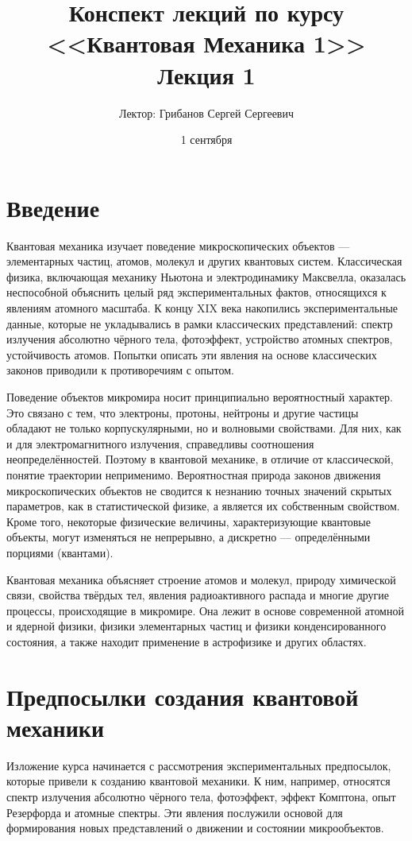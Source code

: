 \documentclass[a4paper, 12pt]{article}
\title{Конспект лекций по курсу <<Квантовая Механика 1>>  \\ \large Лекция 1}
\author{Лектор: Грибанов Сергей Сергеевич}
\date{1 сентября}
\begin{document}
\maketitle

\tableofcontents
\section{Введение}

Квантовая механика изучает поведение микроскопических объектов --- элементарных
частиц, атомов, молекул и других квантовых систем. Классическая физика,
включающая механику Ньютона и электродинамику Максвелла, оказалась неспособной
объяснить целый ряд экспериментальных фактов, относящихся к явлениям атомного
масштаба. К концу XIX века накопились экспериментальные данные, которые не укладывались в рамки
классических представлений: спектр излучения абсолютно чёрного тела,
фотоэффект, устройство атомных спектров, устойчивость атомов. Попытки
описать эти явления на основе классических законов приводили к противоречиям
с опытом.

Поведение объектов микромира носит принципиально вероятностный характер. Это
связано с тем, что электроны, протоны, нейтроны и другие частицы обладают не
только корпускулярными, но и волновыми свойствами. Для них, как и для
электромагнитного излучения, справедливы соотношения неопределённостей.
Поэтому в квантовой механике, в отличие от классической, понятие траектории
неприменимо. Вероятностная природа законов движения микроскопических объектов
не сводится к незнанию точных значений скрытых параметров, как в
статистической физике, а является их собственным свойством. Кроме того,
некоторые физические величины, характеризующие квантовые объекты, могут
изменяться не непрерывно, а дискретно --- определёнными порциями (квантами).

Квантовая механика объясняет строение атомов и молекул, природу химической
связи, свойства твёрдых тел, явления радиоактивного распада и многие другие
процессы, происходящие в микромире. Она лежит в основе современной атомной и
ядерной физики, физики элементарных частиц и физики конденсированного
состояния, а также находит применение в астрофизике и других областях.

\section{Предпосылки создания квантовой механики}

Изложение курса начинается с рассмотрения экспериментальных предпосылок,
которые привели к созданию квантовой механики. К ним, например, относятся
спектр излучения абсолютно чёрного тела, фотоэффект, эффект Комптона, опыт
Резерфорда и атомные спектры. Эти явления послужили основой для формирования
новых представлений о движении и состоянии микрообъектов.
\end{document}

